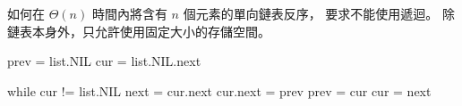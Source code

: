\startEXERCISE
如何在 $\Theta(n)$ 時間內將含有 $n$ 個元素的單向鏈表反序，
要求不能使用遞迴。
除鏈表本身外，只允許使用固定大小的存儲空間。
\stopEXERCISE

\startANSWER
{}
\startCLRSCODE
prev = list.NIL
cur = list.NIL.next

while cur != list.NIL
	next = cur.next
	cur.next = prev
	prev = cur
	cur = next
\stopCLRSCODE
\stopANSWER
